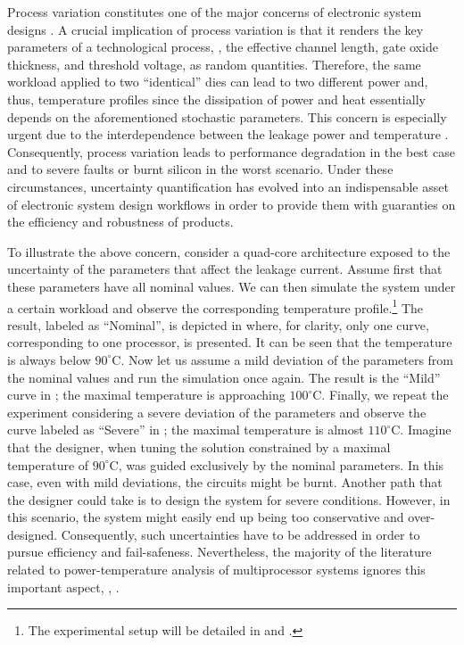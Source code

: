 
Process variation constitutes one of the major concerns of electronic system designs \cite{chandrakasan2001, srivastava2010}.
A crucial implication of process variation is that it renders the key parameters of a technological process, \eg, the effective channel length, gate oxide thickness, and threshold voltage, as random quantities.
Therefore, the same workload applied to two ``identical'' dies can lead to two different power and, thus, temperature profiles since the dissipation of power and heat essentially depends on the aforementioned stochastic parameters.
This concern is especially urgent due to the interdependence between the leakage power and temperature \cite{srivastava2010, liu2007}.
Consequently, process variation leads to performance degradation in the best case and to severe faults or burnt silicon in the worst scenario.
Under these circumstances, uncertainty quantification \cite{xiu2010} has evolved into an indispensable asset of electronic system design workflows in order to provide them with guaranties on the efficiency and robustness of products.

To illustrate the above concern, consider a quad-core architecture exposed to the uncertainty of the parameters that affect the leakage current.
Assume first that these parameters have all nominal values.
We can then simulate the system under a certain workload and observe the corresponding temperature profile.\footnote{The experimental setup will be detailed in  and .}
The result, labeled as ``Nominal'', is depicted in  where, for clarity, only one curve, corresponding to one processor, is presented.
It can be seen that the temperature is always below $90^{\circ}$C.
Now let us assume a mild deviation of the parameters from the nominal values and run the simulation once again.
The result is the ``Mild'' curve in ; the maximal temperature is approaching $100^{\circ}$C.
Finally, we repeat the experiment considering a severe deviation of the parameters and observe the curve labeled as ``Severe'' in ; the maximal temperature is almost $110^{\circ}$C.
Imagine that the designer, when tuning the solution constrained by a maximal temperature of $90^\circ$C, was guided exclusively by the nominal parameters.
In this case, even with mild deviations, the circuits might be burnt.
Another path that the designer could take is to design the system for severe conditions.
However, in this scenario, the system might easily end up being too conservative and over-designed.
Consequently, such uncertainties have to be addressed in order to pursue efficiency and fail-safeness.
Nevertheless, the majority of the literature related to power-temperature analysis of multiprocessor systems ignores this important aspect, \eg, \cite{rao2009, rai2011, thiele2011, ukhov2012}.

